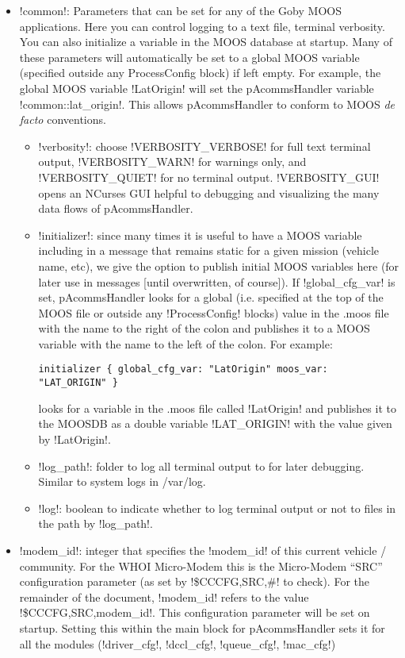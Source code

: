 \begin{itemize}
\item !common!: Parameters that can be set for any of the Goby MOOS applications. Here you can control logging to a text file, terminal verbosity. You can also initialize a variable in the MOOS database at startup. Many of these parameters will automatically be set to a global MOOS variable (specified outside any ProcessConfig block) if left empty. For example, the global MOOS variable !LatOrigin! will set the pAcommsHandler variable !common::lat_origin!. This allows pAcommsHandler to conform to MOOS \textit{de facto} conventions.
\begin{itemize}
\item !verbosity!: choose !VERBOSITY_VERBOSE! for full text terminal output, !VERBOSITY_WARN! for warnings only, and !VERBOSITY_QUIET! for no terminal output. !VERBOSITY_GUI! opens an NCurses GUI helpful to debugging and visualizing the many data flows of pAcommsHandler. 
\item !initializer!: since many times it is useful to have a MOOS variable including in a message that remains static for a given mission (vehicle name, etc), we give the option to publish initial MOOS variables here (for later use in messages [until overwritten, of course]). If !global_cfg_var! is set, pAcommsHandler looks for a global (i.e. specified at the top of the MOOS file or outside any !ProcessConfig! blocks) value in the .moos file with the name to the right of the colon and publishes it to a MOOS variable with the name to the left of the colon. For example:
\begin{verbatim}
initializer { global_cfg_var: "LatOrigin" moos_var: "LAT_ORIGIN" } 
\end{verbatim}
\resetbvlinenumber
looks for a variable in the .moos file called !LatOrigin! and publishes it to the MOOSDB as a double variable !LAT_ORIGIN! with the value given by !LatOrigin!.
\item !log_path!: folder to log all terminal output to for later debugging. Similar to system logs in /var/log.
\item !log!: boolean to indicate whether to log terminal output or not to files in the path by !log_path!.
\end{itemize}
\item !modem_id!: integer that specifies the !modem_id! of this current vehicle / community. For the WHOI Micro-Modem this is the Micro-Modem ``SRC'' configuration parameter (as set by !\$CCCFG,SRC,#! to check). For the remainder of the document, !modem_id! refers to the value !\$CCCFG,SRC,modem_id!. This configuration parameter will be set on startup. Setting this within the main block for pAcommsHandler sets it for all the modules (!driver_cfg!, !dccl_cfg!, !queue_cfg!, !mac_cfg!)

\end{itemize}
